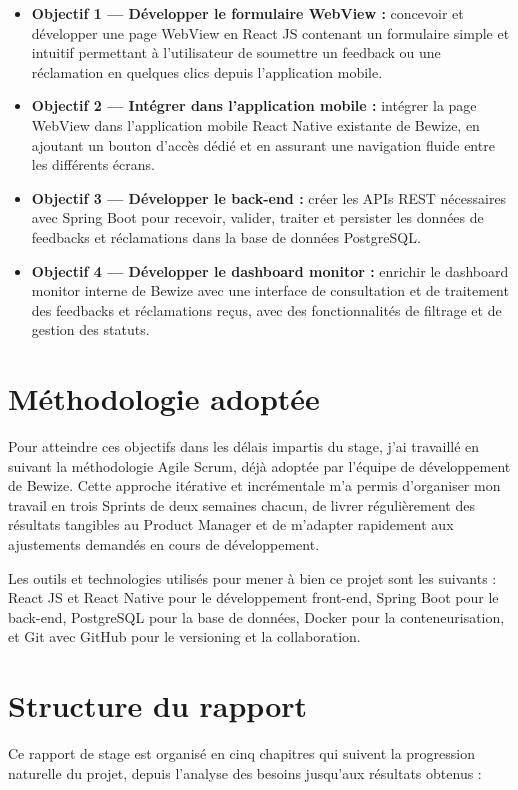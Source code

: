 \begin{itemize}
    \item \textbf{Objectif 1 — Développer le formulaire WebView :} 
    concevoir et développer une page WebView en React JS contenant 
    un formulaire simple et intuitif permettant à l'utilisateur de 
    soumettre un feedback ou une réclamation en quelques clics depuis 
    l'application mobile.
    
    \item \textbf{Objectif 2 — Intégrer dans l'application mobile :} 
    intégrer la page WebView dans l'application mobile React Native 
    existante de Bewize, en ajoutant un bouton d'accès dédié et en 
    assurant une navigation fluide entre les différents écrans.
    
    \item \textbf{Objectif 3 — Développer le back-end :} créer les 
    APIs REST nécessaires avec Spring Boot pour recevoir, valider, 
    traiter et persister les données de feedbacks et réclamations 
    dans la base de données PostgreSQL.
    
    \item \textbf{Objectif 4 — Développer le dashboard monitor :} 
    enrichir le dashboard monitor interne de Bewize avec une interface 
    de consultation et de traitement des feedbacks et réclamations 
    reçus, avec des fonctionnalités de filtrage et de gestion des statuts.
\end{itemize}

\section{Méthodologie adoptée}
Pour atteindre ces objectifs dans les délais impartis du stage, 
j'ai travaillé en suivant la méthodologie Agile Scrum, déjà adoptée 
par l'équipe de développement de Bewize. Cette approche itérative 
et incrémentale m'a permis d'organiser mon travail en trois Sprints 
de deux semaines chacun, de livrer régulièrement des résultats 
tangibles au Product Manager et de m'adapter rapidement aux 
ajustements demandés en cours de développement.

Les outils et technologies utilisés pour mener à bien ce projet 
sont les suivants : React JS et React Native pour le développement 
front-end, Spring Boot pour le back-end, PostgreSQL pour la base 
de données, Docker pour la conteneurisation, et Git avec GitHub 
pour le versioning et la collaboration.

\section{Structure du rapport}
Ce rapport de stage est organisé en cinq chapitres qui suivent 
la progression naturelle du projet, depuis l'analyse des besoins 
jusqu'aux résultats obtenus :

